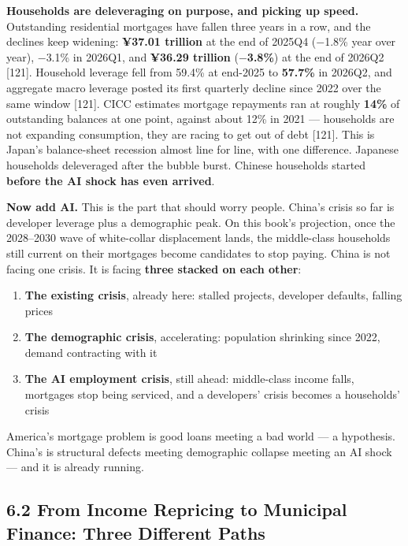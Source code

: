 \documentclass[11pt,a4paper]{article}
\begin{document}
\textbf{Households are deleveraging on purpose, and picking up speed.} Outstanding residential mortgages have fallen three years in a row, and the declines keep widening: \textbf{¥37.01 trillion} at the end of 2025Q4 ($-$1.8\% year over year), $-$3.1\% in 2026Q1, and \textbf{¥36.29 trillion} (\textbf{$-$3.8\%}) at the end of 2026Q2 [121]. Household leverage fell from 59.4\% at end-2025 to \textbf{57.7\%} in 2026Q2, and aggregate macro leverage posted its first quarterly decline since 2022 over the same window [121]. CICC estimates mortgage repayments ran at roughly \textbf{14\%} of outstanding balances at one point, against about 12\% in 2021 --- households are not expanding consumption, they are racing to get out of debt [121]. This is Japan's balance-sheet recession almost line for line, with one difference. Japanese households deleveraged after the bubble burst. Chinese households started \textbf{before the AI shock has even arrived}.

\textbf{Now add AI.} This is the part that should worry people. China's crisis so far is developer leverage plus a demographic peak. On this book's projection, once the 2028--2030 wave of white-collar displacement lands, the middle-class households still current on their mortgages become candidates to stop paying. China is not facing one crisis. It is facing \textbf{three stacked on each other}:

\begin{enumerate}
  \item \textbf{The existing crisis}, already here: stalled projects, developer defaults, falling prices
  \item \textbf{The demographic crisis}, accelerating: population shrinking since 2022, demand contracting with it
  \item \textbf{The AI employment crisis}, still ahead: middle-class income falls, mortgages stop being serviced, and a developers' crisis becomes a households' crisis
\end{enumerate}

America's mortgage problem is good loans meeting a bad world --- a hypothesis. China's is structural defects meeting demographic collapse meeting an AI shock --- and it is already running.

\subsection{6.2 From Income Repricing to Municipal Finance: Three Different Paths}
\end{document}
